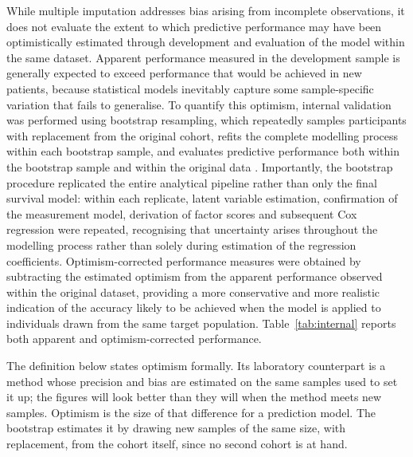 While multiple imputation addresses bias arising from incomplete observations, it does not evaluate the extent to which predictive performance may have been optimistically estimated through development and evaluation of the model within the same dataset. Apparent performance measured in the development sample is generally expected to exceed performance that would be achieved in new patients, because statistical models inevitably capture some sample-specific variation that fails to generalise. To quantify this optimism, internal validation was performed using bootstrap resampling, which repeatedly samples participants with replacement from the original cohort, refits the complete modelling process within each bootstrap sample, and evaluates predictive performance both within the bootstrap sample and within the original data \citep{steyerberg_2019}. Importantly, the bootstrap procedure replicated the entire analytical pipeline rather than only the final survival model: within each replicate, latent variable estimation, confirmation of the measurement model, derivation of factor scores and subsequent Cox regression were repeated, recognising that uncertainty arises throughout the modelling process rather than solely during estimation of the regression coefficients. Optimism-corrected performance measures were obtained by subtracting the estimated optimism from the apparent performance observed within the original dataset, providing a more conservative and more realistic indication of the accuracy likely to be achieved when the model is applied to individuals drawn from the same target population. Table~\ref{tab:internal} reports both apparent and optimism-corrected performance.

The definition below states optimism formally. Its laboratory counterpart is a method whose precision and bias are estimated on the same samples used to set it up; the figures will look better than they will when the method meets new samples. Optimism is the size of that difference for a prediction model. The bootstrap estimates it by drawing new samples of the same size, with replacement, from the cohort itself, since no second cohort is at hand.

